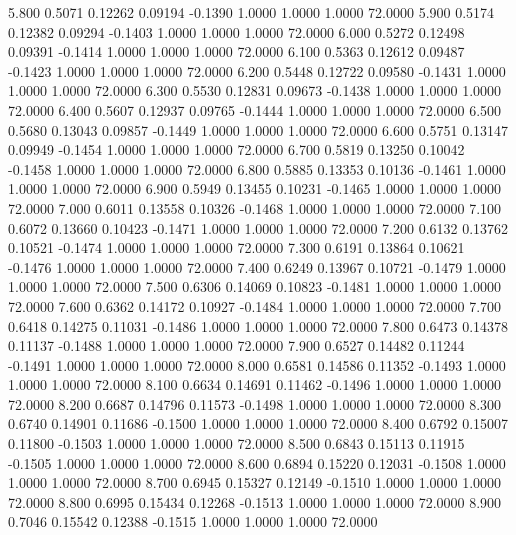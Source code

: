    5.800   0.5071   0.12262   0.09194  -0.1390   1.0000   1.0000   1.0000  72.0000
   5.900   0.5174   0.12382   0.09294  -0.1403   1.0000   1.0000   1.0000  72.0000
   6.000   0.5272   0.12498   0.09391  -0.1414   1.0000   1.0000   1.0000  72.0000
   6.100   0.5363   0.12612   0.09487  -0.1423   1.0000   1.0000   1.0000  72.0000
   6.200   0.5448   0.12722   0.09580  -0.1431   1.0000   1.0000   1.0000  72.0000
   6.300   0.5530   0.12831   0.09673  -0.1438   1.0000   1.0000   1.0000  72.0000
   6.400   0.5607   0.12937   0.09765  -0.1444   1.0000   1.0000   1.0000  72.0000
   6.500   0.5680   0.13043   0.09857  -0.1449   1.0000   1.0000   1.0000  72.0000
   6.600   0.5751   0.13147   0.09949  -0.1454   1.0000   1.0000   1.0000  72.0000
   6.700   0.5819   0.13250   0.10042  -0.1458   1.0000   1.0000   1.0000  72.0000
   6.800   0.5885   0.13353   0.10136  -0.1461   1.0000   1.0000   1.0000  72.0000
   6.900   0.5949   0.13455   0.10231  -0.1465   1.0000   1.0000   1.0000  72.0000
   7.000   0.6011   0.13558   0.10326  -0.1468   1.0000   1.0000   1.0000  72.0000
   7.100   0.6072   0.13660   0.10423  -0.1471   1.0000   1.0000   1.0000  72.0000
   7.200   0.6132   0.13762   0.10521  -0.1474   1.0000   1.0000   1.0000  72.0000
   7.300   0.6191   0.13864   0.10621  -0.1476   1.0000   1.0000   1.0000  72.0000
   7.400   0.6249   0.13967   0.10721  -0.1479   1.0000   1.0000   1.0000  72.0000
   7.500   0.6306   0.14069   0.10823  -0.1481   1.0000   1.0000   1.0000  72.0000
   7.600   0.6362   0.14172   0.10927  -0.1484   1.0000   1.0000   1.0000  72.0000
   7.700   0.6418   0.14275   0.11031  -0.1486   1.0000   1.0000   1.0000  72.0000
   7.800   0.6473   0.14378   0.11137  -0.1488   1.0000   1.0000   1.0000  72.0000
   7.900   0.6527   0.14482   0.11244  -0.1491   1.0000   1.0000   1.0000  72.0000
   8.000   0.6581   0.14586   0.11352  -0.1493   1.0000   1.0000   1.0000  72.0000
   8.100   0.6634   0.14691   0.11462  -0.1496   1.0000   1.0000   1.0000  72.0000
   8.200   0.6687   0.14796   0.11573  -0.1498   1.0000   1.0000   1.0000  72.0000
   8.300   0.6740   0.14901   0.11686  -0.1500   1.0000   1.0000   1.0000  72.0000
   8.400   0.6792   0.15007   0.11800  -0.1503   1.0000   1.0000   1.0000  72.0000
   8.500   0.6843   0.15113   0.11915  -0.1505   1.0000   1.0000   1.0000  72.0000
   8.600   0.6894   0.15220   0.12031  -0.1508   1.0000   1.0000   1.0000  72.0000
   8.700   0.6945   0.15327   0.12149  -0.1510   1.0000   1.0000   1.0000  72.0000
   8.800   0.6995   0.15434   0.12268  -0.1513   1.0000   1.0000   1.0000  72.0000
   8.900   0.7046   0.15542   0.12388  -0.1515   1.0000   1.0000   1.0000  72.0000
